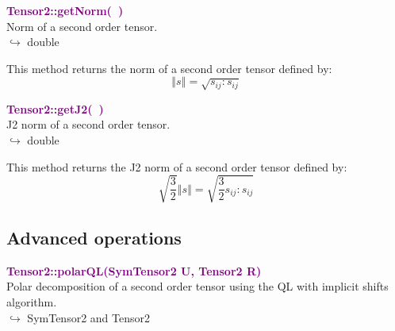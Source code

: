 \textcolor{purple}{\textbf{Tensor2::getNorm(~)}}\label{Tensor2::getNorm()}\\
Norm of a second order tensor.\\ \hspace*{10mm}$\hookrightarrow$ double

This method returns the norm of a second order tensor defined by:\begin{equation*}
\left\Vert s \right\Vert  = \sqrt {s_{ij}:s_{ij}}
\end{equation*}

\textcolor{purple}{\textbf{Tensor2::getJ2(~)}}\label{Tensor2::getJ2()}\\
J2 norm of a second order tensor.\\ \hspace*{10mm}$\hookrightarrow$ double

This method returns the J2 norm of a second order tensor defined by:
\begin{equation*}
\sqrt {\frac{3}{2}} \left\Vert s \right\Vert  = \sqrt {\frac{3}{2} s_{ij}:s_{ij}}
\end{equation*}

\subsection{Advanced operations}

\textcolor{purple}{\textbf{Tensor2::polarQL(SymTensor2 U, Tensor2 R)}}\label{Tensor2::polarQL(SymTensor2 U, Tensor2 R)}\\
Polar decomposition of a second order tensor using the QL with implicit shifts algorithm.\\ \hspace*{10mm}$\hookrightarrow$ SymTensor2 and Tensor2

